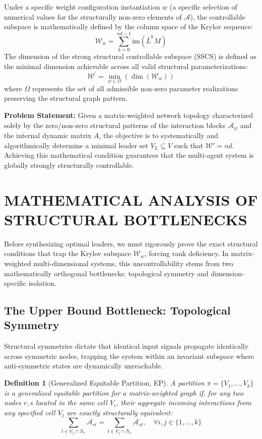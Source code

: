 \documentclass{IEEEtran}
\newtheorem{definition}{Definition}
\begin{document}
	Under a specific weight configuration instantiation $w$ (a specific selection of numerical values for the structurally non-zero elements of $\mathcal{A}$), the controllable subspace is mathematically defined by the column space of the Krylov sequence:
	\begin{equation}
		\mathcal{W}_{w} = \sum_{k=0}^{nd-1} \text{im}\left( \bar{L}^k M \right) \label{eq:krylov}
	\end{equation}
	The dimension of the strong structural controllable subspace (SSCS) is defined as the minimal dimension achievable across all valid structural parameterizations:
	\begin{equation}
		\mathcal{W}^{\prime} = \min_{w \in \Omega}(\dim(\mathcal{W}_{w}))
	\end{equation}
	where $\Omega$ represents the set of all admissible non-zero parameter realizations preserving the structural graph pattern.
	
	\textbf{Problem Statement:} Given a matrix-weighted network topology characterized solely by the zero/non-zero structural patterns of the interaction blocks $\mathcal{A}_{ij}$ and the internal dynamic matrix $A$, the objective is to systematically and algorithmically determine a minimal leader set $V_L \subseteq V$ such that $\mathcal{W}' = nd$. Achieving this mathematical condition guarantees that the multi-agent system is globally strongly structurally controllable.
	
	\section{MATHEMATICAL ANALYSIS OF STRUCTURAL BOTTLENECKS}
	Before synthesizing optimal leaders, we must rigorously prove the exact structural conditions that trap the Krylov subspace $\mathcal{W}_w$, forcing rank deficiency. In matrix-weighted multi-dimensional systems, this uncontrollability stems from two mathematically orthogonal bottlenecks: topological symmetry and dimension-specific isolation.
	
	\subsection{The Upper Bound Bottleneck: Topological Symmetry}
	Structural symmetries dictate that identical input signals propagate identically across symmetric nodes, trapping the system within an invariant subspace where anti-symmetric states are dynamically unreachable.
	
	\begin{definition}[Generalized Equitable Partition, EP]
		A partition $\pi=\{V_{1},\dots,V_{k}\}$ is a generalized equitable partition for a matrix-weighted graph if, for any two nodes $r, s$ located in the same cell $V_{i}$, their aggregate incoming interactions from any specified cell $V_j$ are exactly structurally equivalent:
		\begin{equation}
			\sum_{t \in V_{j} \cap N_r} \mathcal{A}_{rt} = \sum_{t \in V_{j} \cap N_s} \mathcal{A}_{st}, \quad \forall i, j \in \{1,\dots,k\} \label{eq:ep_def}
		\end{equation}
	\end{definition}
	
\end{document}
